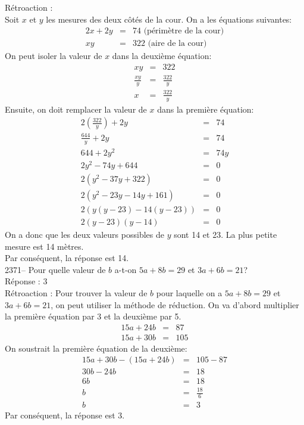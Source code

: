 \documentclass[letterpaper, 12pt]{article}
\begin{document}
R\'etroaction :\\
Soit $x$ et $y$ les mesures des deux c\^ot\'es de la cour. On a les \'equations suivantes:
\begin{eqnarray*}
 2x+2y&=&74 \textrm{   (p\'erim\`etre de la cour)}\\
xy&=&322 \textrm{   (aire de la cour)}
\end{eqnarray*}
On peut isoler la valeur de $x$ dans la deuxi\`eme \'equation:
\begin{eqnarray*}
 xy&=&322\\[2mm]
 \frac{xy}{y}&=&\frac{322}{y}\\[2mm]
x&=&\frac{322}{y}
\end{eqnarray*}
Ensuite, on doit remplacer la valeur de $x$ dans la premi\`ere \'equation:
\begin{eqnarray*}
  2\left( \frac{322}{y}\right) +2y&=&74\\[2mm]
 \frac{644}{y}+2y&=&74\\[2mm]
 644+2y^{2}&=&74y\\
 2y^{2}-74y+644&=&0\\
 2(y^{2}-37y+322)&=&0\\
 2(y^{2}-23y-14y+161)&=&0\\
 2(y(y-23)-14(y-23))&=&0\\
 2(y-23)(y-14)&=&0
\end{eqnarray*}
On a donc que les deux valeurs possibles de $y$ sont 14 et 23. La plus petite mesure est 14 m\`etres.\\
Par cons\'equent, la r\'eponse est 14.\\

2371-- Pour quelle valeur de $b$ a-t-on $5a+8b=29$ et $3a+6b=21$?\\

R\'eponse : 3\\

R\'etroaction :
Pour trouver la valeur de $b$ pour laquelle on a  $5a+8b=29$ et $3a+6b=21$, on peut utiliser la m\'ethode de r\'eduction. On va d'abord multiplier la premi\`ere \'equation par 3 et la deuxi\`eme par 5.
\begin{eqnarray*}
  15a+24b&=&87\\
15a+30b&=&105
\end{eqnarray*}
On soustrait la premi\`ere \'equation de la deuxi\`eme:
\begin{eqnarray*}
 15a+30b -(15a+24b)&=&105- 87\\
 30b-24b&=&18\\
 6b&=&18\\[2mm]
 b&=&\frac{18}{6}\\[2mm]
b&=&3
\end{eqnarray*}
Par cons\'equent, la r\'eponse est 3.\\
\end{document}

